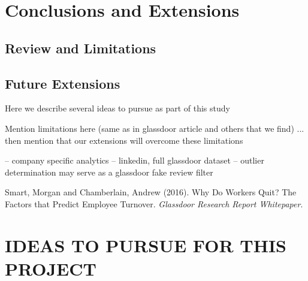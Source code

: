 \documentclass{amsart}[12pt]
\begin{document}
\section{Conclusions and Extensions} 

\subsection{Review and Limitations}


\subsection{Future Extensions }

Here we describe several ideas to pursue as part of this study

Mention limitations here (same as in glassdoor article and others that we find) ... then 
mention that our extensions will overcome these limitations 

-- company specific analytics 
-- linkedin, full glassdoor dataset 
-- outlier determination may serve as a glassdoor fake review filter 


\begin{thebibliography}{100}
     Smart, Morgan and Chamberlain, Andrew (2016). Why Do Workers Quit? The Factors 
        that Predict Employee Turnover. \emph{Glassdoor Research Report Whitepaper}.  
\end{thebibliography}


\section{IDEAS TO PURSUE FOR THIS PROJECT}
\end{document}
